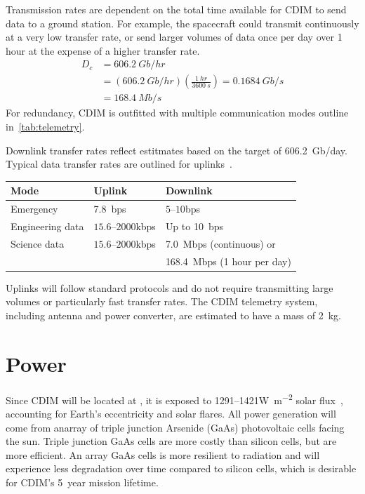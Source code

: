 \documentclass{ws-jai}
\begin{document}
Transmission rates are dependent on the total time available for CDIM to send data to a ground station.
For example, the spacecraft could transmit continuously at a very low transfer rate, or send larger volumes of data once per day over 1 hour at the expense of a higher transfer rate.
\begin{equation}\label{eq:telemetry-1hr}
  \begin{split}
    D_c &= \SI{606.2}{Gb/hr}  \\
     &= (\SI{606.2}{Gb/hr})(\frac{\SI{1}{hr}}{\SI{3600}{s}}) = \SI{0.1684}{Gb/s} \\
     &= \SI{168.4}{Mb/s}
  \end{split}
\end{equation}
For redundancy, CDIM is outfitted with multiple communication modes outline in~\autoref{tab:telemetry}.

\begin{wstable}[htb]
  \caption{Downlink transfer rates reflect estitmates based on the target of \SI{606.2}{Gb/day}.
  Typical data transfer rates are outlined for uplinks~\cite{smad2015}.
\label{tab:telemetry}}
  \begin{tabular}{@{}lll@{}} \toprule
    Mode & Uplink & Downlink \\ \midrule
    Emergency & \SI{7.8}{bps} & $5$--$10$\si{bps} \\
    Engineering data & $15.6$--$2000$\si{kbps} & Up to \SI{10}{bps} \\
    Science data & $15.6$--$2000$\si{kbps} & \SI{7.0}{Mbps} (continuous) or \\
    & & \SI{168.4}{Mbps} (1 hour per day)\\\bottomrule
  \end{tabular}
\end{wstable}

Uplinks will follow standard protocols and do not require transmitting large volumes or particularly fast transfer rates.
The CDIM telemetry system, including antenna and power converter, are estimated to have a mass of \SI{2}{kg}.

\section{Power}
\label{sec:power}
Since CDIM will be located at \Ltwo, it is exposed to 1291--1421\si{\watt\per\meter\squared} solar flux~\cite{evans2002natural}, accounting for Earth's eccentricity and solar flares.
All power generation will come from anarray of triple junction Arsenide (GaAs) photovoltaic cells facing the sun.
Triple junction GaAs cells are more costly than silicon cells, but are more efficient.
An array GaAs cells is more resilient to radiation and will experience less degradation over time compared to silicon cells, which is desirable for CDIM's \SI{5}{year} mission lifetime.
\end{document}
